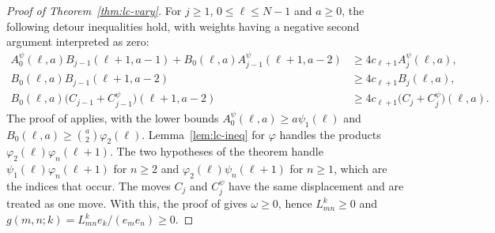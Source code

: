 \begin{proof}[Proof of Theorem~\ref{thm:lc-vary}]
For $j\geq1$, $0\leq\ell\leq N-1$ and $a\geq0$, the following detour inequalities hold, with weights having a negative second argument interpreted as zero:
\[
\begin{aligned}
A^\psi_0(\ell,a)B_{j-1}(\ell+1,a-1)+B_0(\ell,a)A^\psi_{j-1}(\ell+1,a-2)&\geq4c_{\ell+1}A^\psi_j(\ell,a),\\
B_0(\ell,a)B_{j-1}(\ell+1,a-2)&\geq4c_{\ell+1}B_j(\ell,a),\\
B_0(\ell,a)\bigl(C_{j-1}+C^\psi_{j-1}\bigr)(\ell+1,a-2)&\geq4c_{\ell+1}\bigl(C_j+C^\psi_j\bigr)(\ell,a).
\end{aligned}
\]
The proof of \cite[Lemma~]{P1} applies, with the lower bounds $A^\psi_0(\ell,a)\geq a\psi_1(\ell)$ and $B_0(\ell,a)\geq\binom a2\varphi_2(\ell)$. Lemma~\ref{lem:lc-ineq} for $\varphi$ handles the products $\varphi_2(\ell)\varphi_n(\ell+1)$. The two hypotheses of the theorem handle $\psi_1(\ell)\varphi_n(\ell+1)$ for $n\geq2$ and $\varphi_2(\ell)\psi_n(\ell+1)$ for $n\geq1$, which are the indices that occur. The moves $C_j$ and $C^\psi_j$ have the same displacement and are treated as one move. With this, the proof of \cite[Theorem~]{P1} gives $\omega\geq0$, hence $L_{mn}^k\geq0$ and $g(m,n;k)=L_{mn}^ke_k/(e_me_n)\geq0$.
\end{proof}

